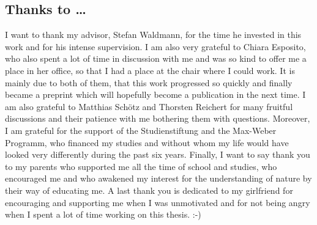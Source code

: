 \subsection*{Thanks to \ldots}

I want to thank my advisor, Stefan Waldmann, for the time he invested in this 
work and for his intense supervision. I am also very grateful to Chiara 
Esposito, who also spent a lot of time in discussion with me and was so kind to 
offer me a place in her office, so that I had a place at the chair where I 
could work. It is mainly due to both of them, that this work progressed so 
quickly and finally became a preprint \cite{esposito.stapor.waldmann:2015a:pre} 
which will hopefully become a publication in the next time. I am also grateful 
to Matthias Sch\"otz and Thorsten Reichert for many fruitful discussions 
and their patience with me bothering them with questions. Moreover, I am 
grateful for the support of the Studienstiftung and the Max-Weber Programm, who 
financed my studies and without whom my life would have looked very 
differently during the past six years. Finally, I want to 
say thank you to my parents who supported me all the time of school and 
studies, who encouraged me and who awakened my interest for the understanding 
of nature by their way of educating me. A last thank you is dedicated to my 
girlfriend for encouraging and supporting me when I was unmotivated and for not 
being angry when I spent a lot of time working on this thesis. :-)
